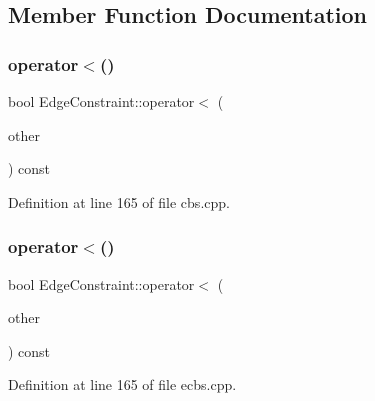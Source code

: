 \subsection{Member Function Documentation}
\mbox{\label{struct_edge_constraint_ab34ad90076811f3480434e7446c5c07a}} 
\subsubsection{\texorpdfstring{operator$<$()}{operator<()}\hspace{0.1cm}{\footnotesize\ttfamily [1/2]}}
{\footnotesize\ttfamily bool Edge\+Constraint\+::operator$<$ (\begin{DoxyParamCaption}\item[{const \hyperlink{struct_edge_constraint}{Edge\+Constraint} \&}]{other }\end{DoxyParamCaption}) const\hspace{0.3cm}{\ttfamily [inline]}}



Definition at line 165 of file cbs.\+cpp.

\mbox{\label{struct_edge_constraint_ab34ad90076811f3480434e7446c5c07a}} 
\subsubsection{\texorpdfstring{operator$<$()}{operator<()}\hspace{0.1cm}{\footnotesize\ttfamily [2/2]}}
{\footnotesize\ttfamily bool Edge\+Constraint\+::operator$<$ (\begin{DoxyParamCaption}\item[{const \hyperlink{struct_edge_constraint}{Edge\+Constraint} \&}]{other }\end{DoxyParamCaption}) const\hspace{0.3cm}{\ttfamily [inline]}}



Definition at line 165 of file ecbs.\+cpp.

\mbox{\label{struct_edge_constraint_a0bb713ad9bf7afb42e84d85a94656af0}} 
